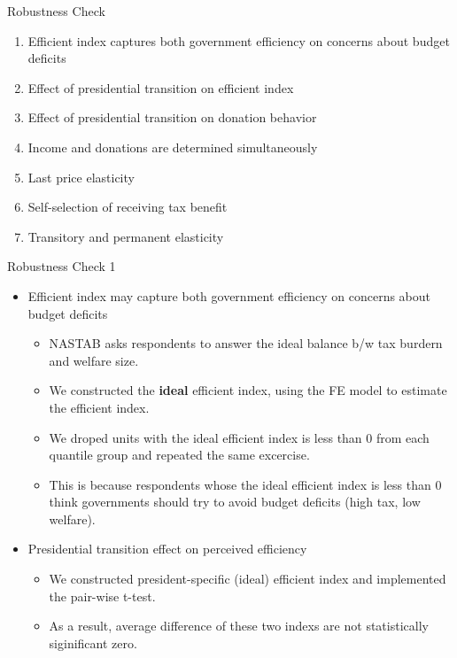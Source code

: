\documentclass[
  ignorenonframetext,
]{beamer}
\providecommand{\tightlist}{%
  \setlength{\itemsep}{0pt}\setlength{\parskip}{0pt}}
\begin{document}
\begin{frame}{Robustness Check}
\protect\hypertarget{robustness-check-3}{}
\begin{enumerate}
\tightlist
\item
  Efficient index captures both government efficiency on concerns about
  budget deficits
\item
  Effect of presidential transition on efficient index
\item
  Effect of presidential transition on donation behavior
\item
  Income and donations are determined simultaneously
\item
  Last price elasticity
\item
  Self-selection of receiving tax benefit
\item
  Transitory and permanent elasticity
\end{enumerate}
\end{frame}

\begin{frame}{Robustness Check 1}
\protect\hypertarget{robustness-check-1-1}{}
\begin{itemize}
\tightlist
\item
  Efficient index may capture both government efficiency on concerns
  about budget deficits

  \begin{itemize}
  \tightlist
  \item
    NASTAB asks respondents to answer the ideal balance b/w tax burdern
    and welfare size.
  \item
    We constructed the \textbf{ideal} efficient index, using the FE
    model to estimate the efficient index.
  \item
    We droped units with the ideal efficient index is less than 0 from
    each quantile group and repeated the same excercise.
  \item
    This is because respondents whose the ideal efficient index is less
    than 0 think governments should try to avoid budget deficits (high
    tax, low welfare).
  \end{itemize}
\item
  Presidential transition effect on perceived efficiency

  \begin{itemize}
  \tightlist
  \item
    We constructed president-specific (ideal) efficient index and
    implemented the pair-wise t-test.
  \item
    As a result, average difference of these two indexs are not
    statistically siginificant zero.
  \end{itemize}
\end{itemize}
\end{frame}
\end{document}
